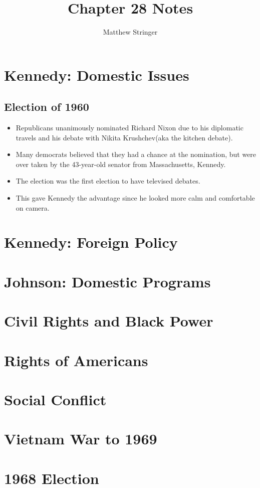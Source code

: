 \documentclass[12pt]{article} %
\title{Chapter 28 Notes} %
\author{Matthew Stringer} %
\begin{document}
	\maketitle
	\tableofcontents
	\newpage
	\section{Kennedy: Domestic Issues}
	\subsection{Election of 1960}
	\begin{itemize}
		\item Republicans unanimously nominated Richard Nixon due to his diplomatic travels and his debate with 
			Nikita Krushchev(aka the kitchen debate).
		\item Many democrats believed that they had a chance at the nomination, but were over taken by the 43-year-old senator from 
			Massachusetts, Kennedy.
		\item The election was the first election to have televised debates.
		\item This gave Kennedy the advantage since he looked more calm and comfortable on camera.
	\end{itemize}

	\subsection{}

	\section{Kennedy: Foreign Policy}
	
	\section{Johnson: Domestic Programs}
	
	\section{Civil Rights and Black Power}

	\section{Rights of Americans}

	\section{Social Conflict}

	\section{Vietnam War to 1969}

	\section{1968 Election}

	\newpage
\end{document}
